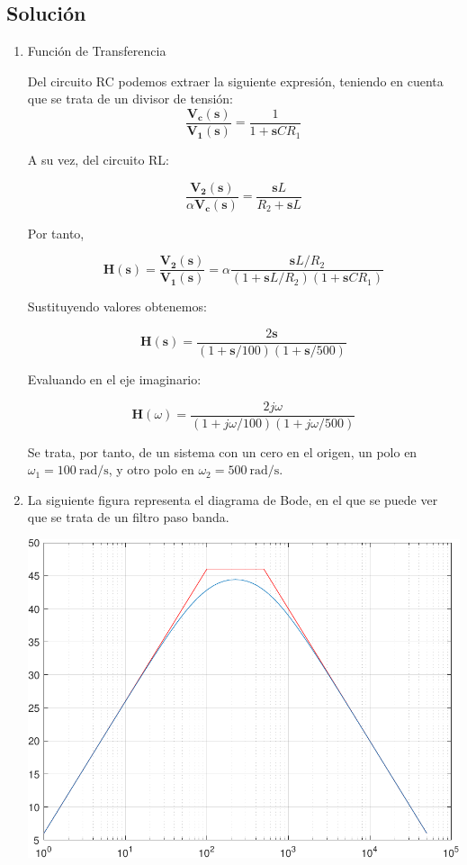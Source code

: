 \documentclass[12pt]{article}
\newcommand{\laplace}[1]{\mathbf{#1}(\mathbf{s})}
\newcommand{\slp}{\mathbf{s}}
\begin{document}
\vspace*{1cm}


\subsection*{Solución}

\begin{enumerate}
\item Función de Transferencia

  Del circuito RC podemos extraer la siguiente expresión, teniendo en cuenta que se trata de un divisor de tensión:
  \[
    \frac{\laplace{V_c}}{\laplace{V_1}} = \frac{1}{1 + \slp C R_1}
  \]

  A su vez, del circuito RL:

  \[
    \frac{\laplace{V_2}}{\alpha \laplace{V_c}} = \frac{\slp L}{R_2 + \slp L}
  \]

  Por tanto,

  \[
    \laplace{H} = \frac{\laplace{V_2}}{\laplace{V_1}} = \alpha \frac{\slp L/R_2}{(1 + \slp L/R_2)(1 + \slp CR_1)}
  \]

  Sustituyendo valores obtenemos:
  
  \[
    \laplace{H} = \frac{2\slp}{(1 + \slp/100)(1 + \slp/500)}
  \]

  Evaluando en el eje imaginario:

  \[
    \mathbf{H}(\omega) = \frac{2j \omega}{(1 + j \omega/100)(1 + j \omega/500)}
  \]

  Se trata, por tanto, de un sistema con un cero en el origen, un polo en $\omega_1 = \SI{100}{\radian\per\second}$, y otro polo en $\omega_2 = \SI{500}{\radian\per\second}$.

\item La siguiente figura representa el diagrama de Bode, en el que se puede ver que se trata de un filtro paso banda.

  \begin{center}
      \includegraphics[height = 0.33\textheight]{figs/bodeplot-cropped}
  \end{center}



  
\end{enumerate}
\end{document}
